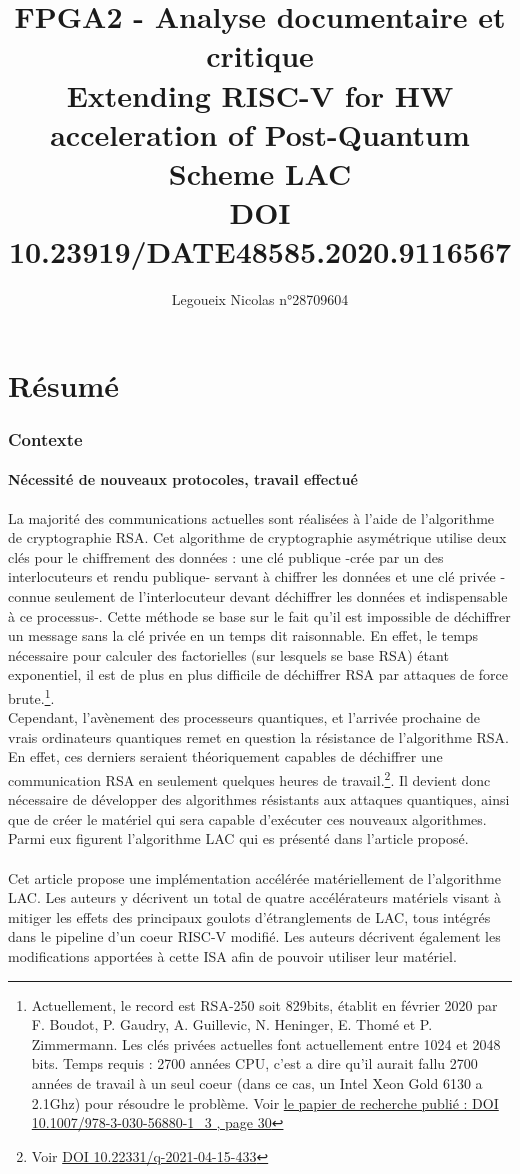 \documentclass[10pt,a4paper]{article}
\author{Legoueix Nicolas n°28709604}
\title{FPGA2 - Analyse documentaire et critique \\ Extending RISC-V for HW acceleration of Post-Quantum Scheme LAC \\ DOI 10.23919/DATE48585.2020.9116567}
\begin{document}
\begingroup
\hypersetup{hidelinks}
\maketitle
\tableofcontents
\endgroup
\newpage
\part{Résumé}

\section{Contexte}
\subsection{Nécessité de nouveaux protocoles, travail effectué}
La majorité des communications actuelles sont réalisées à l'aide de l'algorithme de cryptographie RSA. Cet algorithme de cryptographie asymétrique utilise deux clés pour le 
chiffrement des données : une clé publique -crée par un des interlocuteurs et rendu publique- servant à chiffrer les données et une clé privée -connue seulement de l'interlocuteur devant déchiffrer 
les données et indispensable à ce processus-. Cette méthode se base sur le fait qu'il est impossible de déchiffrer un message sans la clé privée en un temps dit raisonnable. En effet, le temps nécessaire 
pour calculer des factorielles (sur lesquels se base RSA) étant exponentiel, il est de plus en plus difficile de déchiffrer RSA par attaques de force brute.\footnote{Actuellement, le record est RSA-250 soit 829bits, 
établit en février 2020 par F. Boudot, P. Gaudry, A. Guillevic, N. Heninger, E. Thomé et P. Zimmermann. Les clés privées actuelles font actuellement entre 1024 et 2048 bits. Temps requis : 
2700 années CPU, c'est a dire qu'il aurait fallu 2700 années de travail à un seul coeur (dans ce cas, un Intel Xeon Gold 6130 a 2.1Ghz) pour résoudre le problème. Voir \href{https://eprint.iacr.org/2020/697.pdf}{le papier de recherche publié : DOI 10.1007/978-3-030-56880-1\_3 , page 30} }.\\
Cependant, l'avènement des processeurs quantiques, et l'arrivée prochaine de vrais ordinateurs quantiques remet en question la résistance de l'algorithme RSA. En effet, ces derniers seraient théoriquement
capables de déchiffrer une communication RSA en seulement quelques heures de travail.\footnote{Voir \href{https://quantum-journal.org/papers/q-2021-04-15-433/pdf/}{DOI 10.22331/q-2021-04-15-433}}. Il devient donc nécessaire
de développer des algorithmes résistants aux attaques quantiques, ainsi que de créer le matériel qui sera capable d'exécuter ces nouveaux algorithmes. Parmi eux figurent l'algorithme LAC qui es présenté dans l'article proposé.\\~\\
Cet article propose une implémentation accélérée matériellement de l'algorithme LAC. Les auteurs y décrivent un total de quatre accélérateurs matériels visant à mitiger les effets des principaux goulots d'étranglements 
de LAC, tous intégrés dans le pipeline d'un coeur RISC-V modifié. Les auteurs décrivent également les modifications apportées à cette ISA afin de pouvoir utiliser leur matériel.
\end{document}
